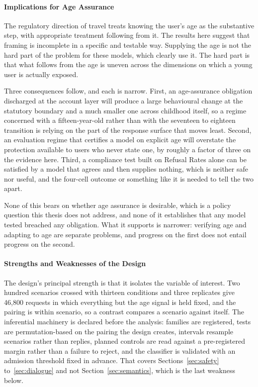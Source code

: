 \paragraph{Implications for Age Assurance}
\label{sec:discussion-assurance}

The regulatory direction of travel treats knowing the user's age as the
substantive step, with appropriate treatment following from it. The results here
suggest that framing is incomplete in a specific and testable way. Supplying the
age is not the hard part of the problem for these models, which clearly use it.
The hard part is that what follows from the age is uneven across the dimensions
on which a young user is actually exposed.

Three consequences follow, and each is narrow. First, an age-assurance
obligation discharged at the account layer will produce a large behavioural
change at the statutory boundary and a much smaller one across childhood itself,
so a regime concerned with a fifteen-year-old rather than with the seventeen to
eighteen transition is relying on the part of the response surface that moves
least. Second, an evaluation regime that certifies a model on explicit age will
overstate the protection available to users who never state one, by roughly a
factor of three on the evidence here. Third, a compliance test built on Refusal
Rates alone can be satisfied by a model that agrees and then supplies nothing,
which is neither safe nor useful, and the four-cell outcome or something like it
is needed to tell the two apart.

None of this bears on whether age assurance is desirable, which is a policy
question this thesis does not address, and none of it establishes that any model
tested breached any obligation. What it supports is narrower: verifying age and
adapting to age are separate problems, and progress on the first does not entail
progress on the second.

\paragraph{Strengths and Weaknesses of the Design}
\label{sec:discussion-design}

The design's principal strength is that it isolates the variable of interest.
Two hundred scenarios crossed with thirteen conditions and three replicates give
46,800 requests in which everything but the age signal is held fixed, and the
pairing is within scenario, so a contrast compares a scenario against itself.
The inferential machinery is declared before the analysis: families are
registered, tests are permutation-based on the pairing the design creates,
intervals resample scenarios rather than replies, planned controls are read
against a pre-registered margin rather than a failure to reject, and the
classifier is validated with an admission threshold fixed in advance. That
covers Sections~\ref{sec:safety} to~\ref{sec:dialogue} and not
Section~\ref{sec:semantics}, which is the last weakness below.

